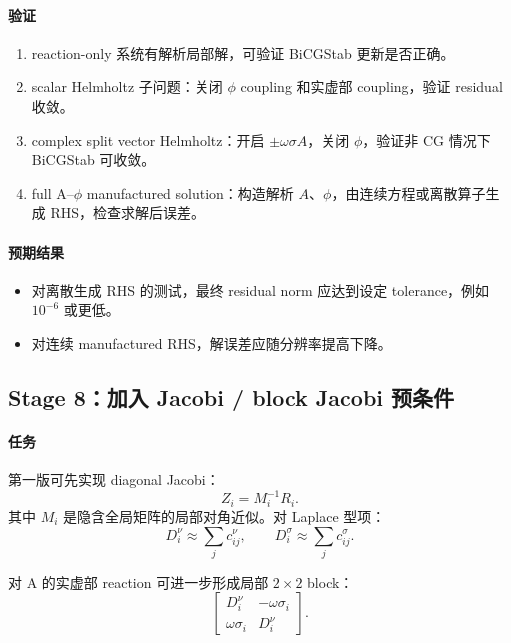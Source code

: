 \documentclass[UTF8,a4paper,11pt]{ctexart}
\begin{document}
\paragraph{验证}
\begin{enumerate}
  \item reaction-only 系统有解析局部解，可验证 BiCGStab 更新是否正确。
  \item scalar Helmholtz 子问题：关闭 $\phi$ coupling 和实虚部 coupling，验证 residual 收敛。
  \item complex split vector Helmholtz：开启 $\pm\omega\sigma A$，关闭 $\phi$，验证非 CG 情况下 BiCGStab 可收敛。
  \item full A--$\phi$ manufactured solution：构造解析 $A$、$\phi$，由连续方程或离散算子生成 RHS，检查求解后误差。
\end{enumerate}

\paragraph{预期结果}
\begin{itemize}
  \item 对离散生成 RHS 的测试，最终 residual norm 应达到设定 tolerance，例如 $10^{-6}$ 或更低。
  \item 对连续 manufactured RHS，解误差应随分辨率提高下降。
\end{itemize}

\subsection{Stage 8：加入 Jacobi / block Jacobi 预条件}

\paragraph{任务}
第一版可先实现 diagonal Jacobi：
\begin{equation}
Z_i=M_i^{-1}R_i.
\end{equation}
其中 $M_i$ 是隐含全局矩阵的局部对角近似。对 Laplace 型项：
\begin{equation}
D^\nu_i\approx \sum_j c^\nu_{ij},
\qquad
D^\sigma_i\approx \sum_j c^\sigma_{ij}.
\end{equation}

对 A 的实虚部 reaction 可进一步形成局部 $2\times2$ block：
\begin{equation}
\begin{bmatrix}
D^\nu_i & -\omega\sigma_i\\
\omega\sigma_i & D^\nu_i
\end{bmatrix}.
\end{equation}
\end{document}
